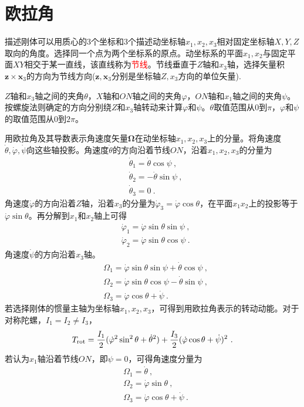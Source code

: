 \documentclass[12pt,a4paper]{article}
\renewcommand{\vec}[1]{\boldsymbol{#1}}
\begin{document}
\section{欧拉角}
\cite{2007理论物理学教程} 描述刚体可以用质心的$3$个坐标和$3$个描述动坐标轴$x_1, x_2, x_3$相对固定坐标轴$X, Y, Z$取向的角度。选择同一个点为两个坐标系的原点。动坐标系的平面$x_1, x_2$与固定平面$XY$相交于某一直线，该直线称为\textcolor{red}{节线}。节线垂直于$Z$轴和$x_3$轴，选择矢量积$\vec{z} \times \vec{x}_3$的方向为节线方向($\vec{z}, \vec{x}_3$分别是坐标轴$Z, x_3$方向的单位矢量).

$Z$轴和$x_3$轴之间的夹角$\theta$，$X$轴和$ON$轴之间的夹角$\varphi$，$ON$轴和$x_1$轴之间的夹角$\psi$。按螺旋法则确定的方向分别绕$Z$和$x_3$轴转动来计算$\varphi$和$\psi$。$\theta$取值范围从$0$到$\pi$，$\varphi$和$\psi$的取值范围从$0$到$2\pi$。

用欧拉角及其导数表示角速度矢量$\vec{\Omega}$在动坐标轴$x_1, x_2, x_3$上的分量。将角速度$\dot{\theta}, \dot{\varphi}, \dot{\psi}$向这些轴投影。角速度$\dot{\theta}$的方向沿着节线$ON$，沿着$x_1, x_2, x_3$的分量为
\begin{align}
& \dot{\theta}_1 = \dot{\theta} \cos \psi ~, \\
& \dot{\theta}_2 = -\dot{\theta} \sin \psi ~, \\
& \dot{\theta}_3 = 0 ~.
\end{align}
角速度$\dot{\varphi}$的方向沿着$Z$轴，沿着$x_3$的分量为$\dot{\varphi}_3 = \dot{\varphi} \cos \theta$，在平面$x_1 x_2$上的投影等于$\dot{\varphi}\sin \theta$。再分解到$x_1$和$x_2$轴上可得
\begin{align}
& \dot{\varphi}_1 = \dot{\varphi} \sin \theta \sin \psi ~, \\
& \dot{\varphi}_2 = \dot{\varphi} \sin \theta \cos \psi ~.
\end{align}
角速度$\dot{\psi}$的方向沿着$x_3$轴。
\begin{align}
& \Omega_1 = \dot{\varphi} \sin \theta \sin \psi +\dot{\theta} \cos \psi ~, \\
& \Omega_2 = \dot{\varphi} \sin \theta \cos \psi -\dot{\theta} \sin \psi ~, \\
& \Omega_3 = \dot{\varphi} \cos \theta +\dot{\psi} ~.
\end{align}
若选择刚体的惯量主轴为坐标轴$x_1, x_2, x_3$，可得到用欧拉角表示的转动动能。对于对称陀螺，$I_1 = I_2 \neq I_3$，
\begin{equation}
T_{\rm rot} = \dfrac{I_1}{2}(\dot{\varphi}^2 \sin^2 \theta +\dot{\theta}^2) +\dfrac{I_3}{2} (\dot{\varphi} \cos \theta +\dot{\psi})^2 ~.
\end{equation}
若认为$x_1$轴沿着节线$ON$，即$\psi = 0$，可得角速度分量为
\begin{align}
& \Omega_1 = \dot{\theta} ~, \\
& \Omega_2 = \dot{\varphi} \sin \theta ~, \\
& \Omega_3 = \dot{\varphi} \cos \theta +\dot{\psi} ~.
\end{align}
\end{document}
